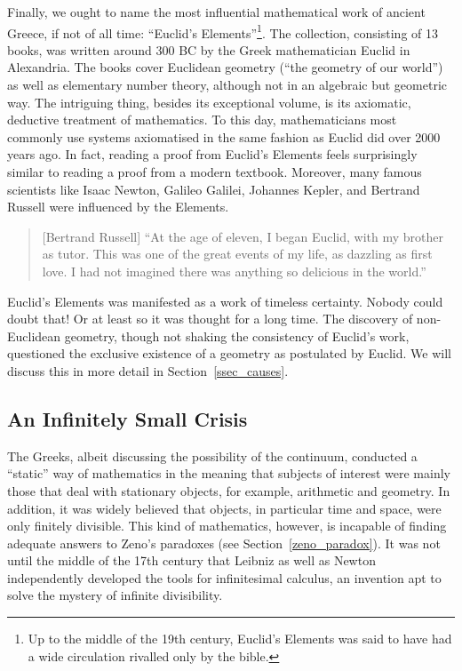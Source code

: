 \documentclass{article}
\begin{document}
Finally, we ought to name the most influential mathematical work of ancient Greece, if not of all time: ``Euclid's Elements''\footnote{Up to the middle of the 19th century, Euclid's Elements was said to have had a wide circulation rivalled only by the bible.}. 
The collection, consisting of 13 books, was written around 300 BC by the Greek mathematician Euclid in Alexandria. The books cover Euclidean geometry (``the geometry of our world'') as well as elementary number theory, although not in an algebraic but geometric way. The intriguing thing, besides its exceptional volume, is its axiomatic, deductive treatment of mathematics. To this day, mathematicians most commonly use systems axiomatised in the same fashion as Euclid did over 2000 years ago. In fact, reading a proof from Euclid's Elements feels surprisingly similar to reading a proof from a modern textbook. Moreover, many famous scientists like Isaac Newton, Galileo Galilei, Johannes Kepler, and Bertrand Russell were influenced by the Elements.
\begin{quote}[Bertrand Russell]
	``At the age of eleven, I began Euclid, with my brother as tutor. This was one of the great events of my life, as dazzling as first love. I had not imagined there was anything so delicious in the world.''\cite{russell_autobiography}
\end{quote}
Euclid's Elements was manifested as a work of timeless certainty. Nobody could doubt that! Or at least so it was thought for a long time. The discovery of non-Euclidean geometry, though not shaking the consistency of Euclid's work, questioned the exclusive existence of a geometry as postulated by Euclid. We will discuss this in more detail in Section~\ref{ssec_causes}.

\subsection{An Infinitely Small Crisis}
The Greeks, albeit discussing the possibility of the continuum, conducted a ``static'' way of mathematics in the meaning that subjects of interest were mainly those that deal with stationary objects, for example, arithmetic and geometry. In addition, it was widely believed that objects, in particular time and space, were only finitely divisible. This kind of mathematics, however, is incapable of finding adequate answers to Zeno's paradoxes (see Section~\ref{zeno_paradox}).
It was not until the middle of the 17th century that Leibniz as well as Newton independently developed the tools for infinitesimal calculus, an invention apt to solve the mystery of infinite divisibility.
\end{document}
